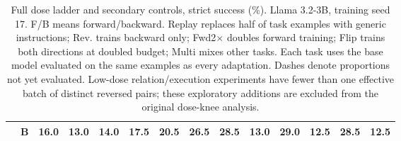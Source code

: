 \begin{table}[t]
\begin{tabular}{llrrrrrrrrrrrr}
 & B & 16.0 & 13.0 & \textcolor{blue!60!black}{\textbf{14.0}} & \textcolor{blue!60!black}{\textbf{17.5}} & 20.5 & 26.5 & 28.5 & 13.0 & 29.0 & 12.5 & 28.5 & 12.5 \\
\bottomrule
\end{tabular}
\caption{Full dose ladder and secondary controls, strict success (\%). Llama 3.2-3B, training seed 17. F/B means forward/backward. Replay replaces half of task examples with generic instructions; Rev. trains backward only; Fwd2$\times$ doubles forward training; Flip trains both directions at doubled budget; Multi mixes other tasks. Each task uses the base model evaluated on the same examples as every adaptation. Dashes denote proportions not yet evaluated. Low-dose relation/execution experiments have fewer than one effective batch of distinct reversed pairs; these exploratory additions are excluded from the original dose-knee analysis.}\label{tab:full-adaptations}
\end{table}
